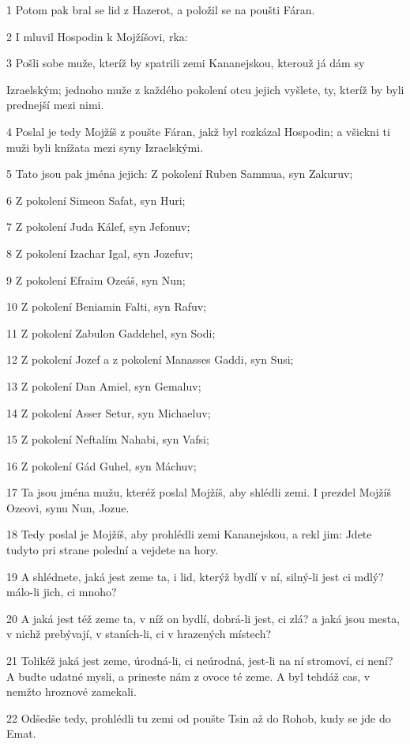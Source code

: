 \par 1 Potom pak bral se lid z Hazerot, a položil se na poušti Fáran.
\par 2 I mluvil Hospodin k Mojžíšovi, rka:
\par 3 Pošli sobe muže, kteríž by spatrili zemi Kananejskou, kterouž já dám sy\par Izraelským; jednoho muže z každého pokolení otcu jejich vyšlete, ty, kteríž by byli prednejší mezi nimi.
\par 4 Poslal je tedy Mojžíš z poušte Fáran, jakž byl rozkázal Hospodin; a všickni ti muži byli knížata mezi syny Izraelskými.
\par 5 Tato jsou pak jména jejich: Z pokolení Ruben Sammua, syn Zakuruv;
\par 6 Z pokolení Simeon Safat, syn Huri;
\par 7 Z pokolení Juda Kálef, syn Jefonuv;
\par 8 Z pokolení Izachar Igal, syn Jozefuv;
\par 9 Z pokolení Efraim Ozeáš, syn Nun;
\par 10 Z pokolení Beniamin Falti, syn Rafuv;
\par 11 Z pokolení Zabulon Gaddehel, syn Sodi;
\par 12 Z pokolení Jozef a z pokolení Manasses Gaddi, syn Susi;
\par 13 Z pokolení Dan Amiel, syn Gemaluv;
\par 14 Z pokolení Asser Setur, syn Michaeluv;
\par 15 Z pokolení Neftalím Nahabi, syn Vafsi;
\par 16 Z pokolení Gád Guhel, syn Máchuv;
\par 17 Ta jsou jména mužu, kteréž poslal Mojžíš, aby shlédli zemi. I prezdel Mojžíš Ozeovi, synu Nun, Jozue.
\par 18 Tedy poslal je Mojžíš, aby prohlédli zemi Kananejskou, a rekl jim: Jdete tudyto pri strane polední a vejdete na hory.
\par 19 A shlédnete, jaká jest zeme ta, i lid, kterýž bydlí v ní, silný-li jest ci mdlý? málo-li jich, ci mnoho?
\par 20 A jaká jest též zeme ta, v níž on bydlí, dobrá-li jest, ci zlá? a jaká jsou mesta, v nichž prebývají, v staních-li, ci v hrazených místech?
\par 21 Tolikéž jaká jest zeme, úrodná-li, ci neúrodná, jest-li na ní stromoví, ci není? A budte udatné mysli, a prineste nám z ovoce té zeme. A byl tehdáž cas, v nemžto hroznové zamekali.
\par 22 Odšedše tedy, prohlédli tu zemi od poušte Tsin až do Rohob, kudy se jde do Emat.

